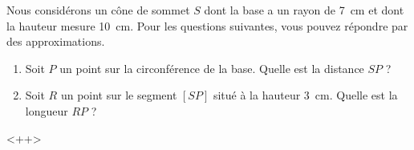 
\begin{exercice}\label{exo2smath-0182}

    Nous considérons un cône de sommet \( S\) dont la base a un rayon de \SI{7}{\centi\meter} et dont la hauteur mesure \SI{10}{\centi\meter}. Pour les questions suivantes, vous pouvez répondre par des approximations.
    \begin{enumerate}
        \item
            Soit \( P\) un point sur la circonférence de la base. Quelle est la distance \( SP\) ?
        \item
            Soit \( R\) un point sur le segment \( [SP]\) situé à la hauteur \SI{3}{\centi\meter}. Quelle est la longueur \( RP\) ?
    \end{enumerate}
    <++>



\end{exercice}
